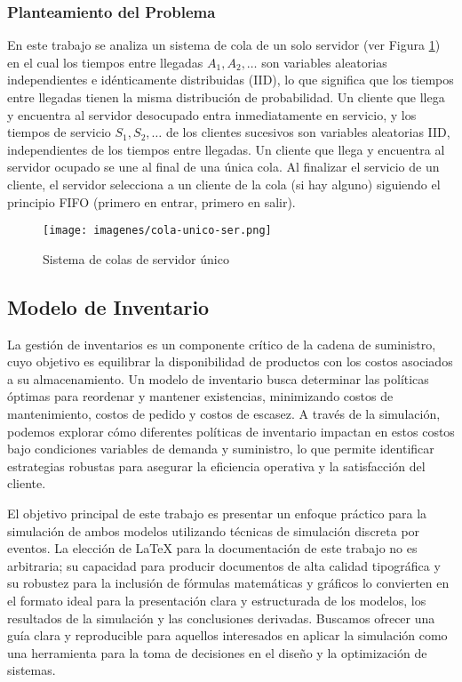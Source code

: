 \documentclass{article}
\begin{document}
\subsubsection{Planteamiento del Problema}
En este trabajo se analiza un sistema de cola de un solo servidor (ver Figura \ref{fig:cola-unico}) en el cual los tiempos entre llegadas \(A_1, A_2, \ldots\) son variables aleatorias independientes e idénticamente distribuidas (IID), lo que significa que los tiempos entre llegadas tienen la misma distribución de probabilidad. Un cliente que llega y encuentra al servidor desocupado entra inmediatamente en servicio, y los tiempos de servicio \(S_1, S_2, \ldots\) de los clientes sucesivos son variables aleatorias IID, independientes de los tiempos entre llegadas. Un cliente que llega y encuentra al servidor ocupado se une al final de una única cola. Al finalizar el servicio de un cliente, el servidor selecciona a un cliente de la cola (si hay alguno) siguiendo el principio FIFO (primero en entrar, primero en salir).
\begin{figure}[H]
    \centering
    \texttt{[image: imagenes/cola-unico-ser.png]}
    \caption{Sistema de colas de servidor único}
    \label{fig:cola-unico}
\end{figure}








\vspace{1em}

\subsection{Modelo de Inventario}
La gestión de inventarios es un componente crítico de la cadena de suministro, cuyo objetivo es equilibrar la disponibilidad de productos con los costos asociados a su almacenamiento. Un modelo de inventario busca determinar las políticas óptimas para reordenar y mantener existencias, minimizando costos de mantenimiento, costos de pedido y costos de escasez. A través de la simulación, podemos explorar cómo diferentes políticas de inventario impactan en estos costos bajo condiciones variables de demanda y suministro, lo que permite identificar estrategias robustas para asegurar la eficiencia operativa y la satisfacción del cliente.

El objetivo principal de este trabajo es presentar un enfoque práctico para la simulación de ambos modelos utilizando técnicas de simulación discreta por eventos. La elección de LaTeX para la documentación de este trabajo no es arbitraria; su capacidad para producir documentos de alta calidad tipográfica y su robustez para la inclusión de fórmulas matemáticas y gráficos lo convierten en el formato ideal para la presentación clara y estructurada de los modelos, los resultados de la simulación y las conclusiones derivadas. Buscamos ofrecer una guía clara y reproducible para aquellos interesados en aplicar la simulación como una herramienta para la toma de decisiones en el diseño y la optimización de sistemas.
\end{document}
